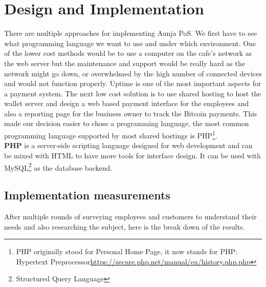 \section{Design and Implementation}
\label{Design and Implementation}

There are multiple approaches for implementing Aunja PoS. We first have to see what programming language we want to use and under which environment. One of the lower cost methods would be to use a computer on the cafe's network as the web server but the maintenance and support would be really hard as the network might go down, or overwhelmed by the high number of connected devices and would not function properly. Uptime is one of the most important aspects for a payment system. The next low cost solution is to use shared hosting to host the wallet server and design a web based payment interface for the employees and also a reporting page for the business owner to track the Bitcoin payments. This made our decision easier to chose a programming language, the most common programming language supported by most shared hostings is PHP\footnote{PHP originally stood for Personal Home Page, it now stands for PHP: Hypertext Preprocessor\url{https://secure.php.net/manual/en/history.php.php}}. 
\\ \textbf{PHP} is a server-side scripting language designed for web development and can be mixed with HTML to have more tools for interface design. It can be used with MySQL\footnote{Structured Query Language} as the database backend.

\subsection{Implementation measurements}
\label{Implementation measurements}
After multiple rounds of surveying employees and customers to understand their needs and also researching the subject, here is the break down of the results.
